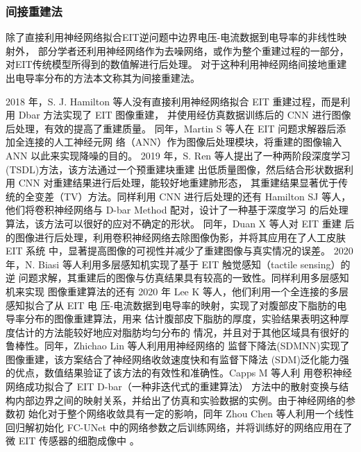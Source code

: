 \subsubsection{间接重建法}
除了直接利用神经网络拟合EIT逆问题中边界电压-电流数据到电导率的非线性映射外，
部分学者还利用神经网络作为去噪网络，或作为整个重建过程的一部分，对EIT传统模型所得到的数值解进行后处理。
对于这种利用神经网络间接地重建出电导率分布的方法本文称其为间接重建法。 

2018 年，S. J. Hamilton 等人没有直接利用神经网络拟合 EIT 重建过程，而是利用 Dbar 方法实现了 EIT 图像重建，
并使用经仿真数据训练后的 CNN 进行图像后处理，有效的提高了重建质量\cite{8352045}。
同年，Martin S 等人在 EIT 问题求解器后添加全连接的人工神经元网
络（ANN）作为图像后处理模块，将重建的图像输入 ANN 以此来实现降噪的目的\cite{S2017A}。
2019 年，S. Ren 等人提出了一种两阶段深度学习(TSDL)方法，该方法通过一个预重建块重建
出低质量图像，然后结合形状数据利用 CNN 对重建结果进行后处理，能较好地重建肺形态，
其重建结果显著优于传统的全变差（TV）方法\cite{8907811}。同样利用 CNN 进行后处理的还有
Hamilton SJ 等人，他们将卷积神经网络与 D-bar Method 配对，设计了一种基于深度学习
的后处理算法，该方法可以很好的应对不确定的形状\cite{2019Beltrami}。 同年，Duan X 等人对 EIT 重建
后的图像进行后处理，利用卷积神经网络去除图像伪影，并将其应用在了人工皮肤 EIT 系统
中，显著提高图像的可视性并减少了重建图像与真实情况的误差\cite{2019Artificial}。
2020 年，N. Biasi 等人利用多层感知机实现了基于 EIT 触觉感知（tactile sensing）的逆
问题求解，其重建后的图像与仿真结果具有较高的一致性\cite{9278823}。同样利用多层感知机来实现
图像重建算法的还有 2020 年 Lee K 等人，他们利用一个全连接的多层感知拟合了从 EIT 电
压-电流数据到电导率的映射，实现了对腹部皮下脂肪的电导率分布的图像重建算法，用来
估计腹部皮下脂肪的厚度，实验结果表明这种厚度估计的方法能较好地应对脂肪均匀分布的
情况，并且对于其他区域具有很好的鲁棒性\cite{2020Electrical}。同年，Zhichao Lin 等人利用用神经网络的
监督下降法(SDMNN)实现了图像重建，该方案结合了神经网络收敛速度快和有监督下降法
(SDM)泛化能力强的优点，数值结果验证了该方法的有效性和准确性\cite{9060508}。Capps M 等人利
用卷积神经网络成功拟合了 EIT D-bar（一种非迭代式的重建算法） 方法中的散射变换与结
构内部边界之间的映射关系，并给出了仿真和实验数据的实例\cite{9130138}。由于神经网络的参数初
始化对于整个网络收敛具有一定的影响，同年 Zhou Chen 等人利用一个线性回归解初始化
FC-UNet 中的网络参数之后训练网络，并将训练好的网络应用在了微 EIT 传感器的细胞成像中 \cite{9128764}。

